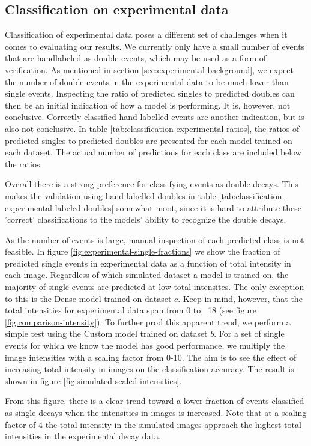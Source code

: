 \subsection{Classification on experimental data}
Classification of experimental data poses a different set of challenges when it comes
to evaluating our results. We currently only have a small number of events that are 
handlabeled as double events, which may be used as a form of verification. As mentioned in section
\ref{sec:experimental-background}, we expect the number of double events in the experimental
data to be much lower than single events. Inspecting the ratio of predicted singles to predicted
doubles can then be an initial indication of how a model is performing. It is, however,
not conclusive. Correctly classified hand labelled events are another indication, but
is also not conclusive. In table \ref{tab:classification-experimental-ratios}, the ratios
of predicted singles to predicted doubles are presented for each model trained on each
dataset. The actual number of predictions for each class are included below the ratios.

Overall there is a strong preference for classifying events as double decays. This makes
the validation using hand labelled doubles in table \ref{tab:classification-experimental-labeled-doubles}
somewhat moot, since it is hard to attribute these 'correct' classifications to the models'
ability to recognize the double decays.


As the number of events is large, manual inspection of each predicted class is not feasible.
In figure \ref{fig:experimental-single-fractions} we show the fraction of predicted single events
in experimental data as a function of total intensity in each image. Regardless of which simulated
dataset a model is trained on, the majority of  single events are predicted at low total intensites.
The only exception to this is the Dense model trained on dataset $c$. Keep in mind, however, that the
total intensities for experimental data span from 0 to ~18 (see figure \ref{fig:comparison-intensity}).
To further prod this apparent trend, we perform a simple test using the Custom model trained on dataset $b$.
For a set of single events for which we know the model has good performance, we multiply the image intensities
with a scaling factor from 0-10. The aim is to see the effect of increasing total intensity in
images on the classification accuracy. The result is shown in figure \ref{fig:simulated-scaled-intensities}.

From this figure, there is a clear trend toward a lower fraction of events classified as single decays
when the intensities in images is increased. Note that at a scaling factor of 4 the total intensity in
the simulated images approach the highest total intensities in the experimental decay data.
 
